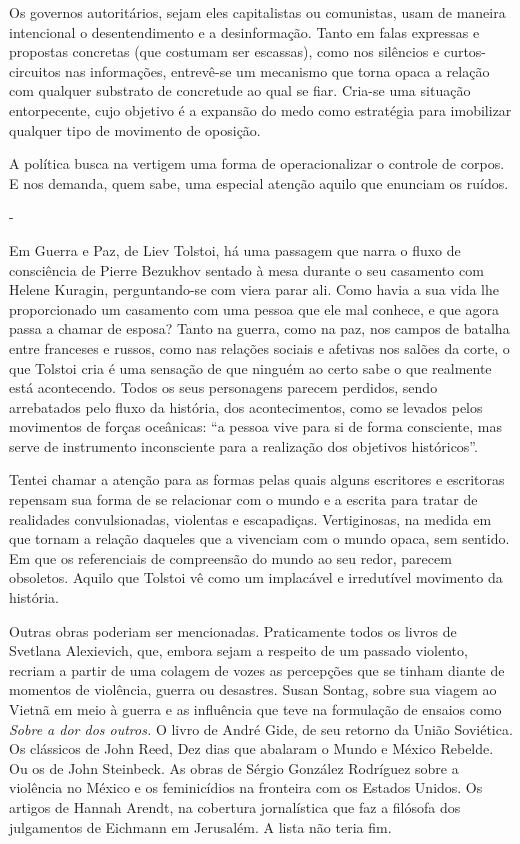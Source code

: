 Os governos autoritários, sejam eles capitalistas ou comunistas, usam de
maneira intencional o desentendimento e a desinformação. Tanto em falas
expressas e propostas concretas (que costumam ser escassas), como nos
silêncios e curtos-circuitos nas informações, entrevê-se um mecanismo
que torna opaca a relação com qualquer substrato de concretude ao qual
se fiar. Cria-se uma situação entorpecente, cujo objetivo é a expansão
do medo como estratégia para imobilizar qualquer tipo de movimento de
oposição.

A política busca na vertigem uma forma de operacionalizar o controle de
corpos. E nos demanda, quem sabe, uma especial atenção aquilo que
enunciam os ruídos.

-

Em Guerra e Paz, de Liev Tolstoi, há uma passagem que narra o fluxo de
consciência de Pierre Bezukhov sentado à mesa durante o seu casamento
com Helene Kuragin, perguntando-se com viera parar ali. Como havia a sua
vida lhe proporcionado um casamento com uma pessoa que ele mal conhece,
e que agora passa a chamar de esposa? Tanto na guerra, como na paz, nos
campos de batalha entre franceses e russos, como nas relações sociais e
afetivas nos salões da corte, o que Tolstoi cria é uma sensação de que
ninguém ao certo sabe o que realmente está acontecendo. Todos os seus
personagens parecem perdidos, sendo arrebatados pelo fluxo da história,
dos acontecimentos, como se levados pelos movimentos de forças
oceânicas: ``a pessoa vive para si de forma consciente, mas serve de
instrumento inconsciente para a realização dos objetivos históricos''.

Tentei chamar a atenção para as formas pelas quais alguns escritores e
escritoras repensam sua forma de se relacionar com o mundo e a escrita
para tratar de realidades convulsionadas, violentas e escapadiças.
Vertiginosas, na medida em que tornam a relação daqueles que a vivenciam
com o mundo opaca, sem sentido. Em que os referenciais de compreensão do
mundo ao seu redor, parecem obsoletos. Aquilo que Tolstoi vê como um
implacável e irredutível movimento da história.

Outras obras poderiam ser mencionadas. Praticamente todos os livros de
Svetlana Alexievich, que, embora sejam a respeito de um passado
violento, recriam a partir de uma colagem de vozes as percepções que se
tinham diante de momentos de violência, guerra ou desastres. Susan
Sontag, sobre sua viagem ao Vietnã em meio à guerra e as influência que
teve na formulação de ensaios como \emph{Sobre a dor dos outros.} O
livro de André Gide, de seu retorno da União Soviética. Os clássicos de
John Reed, Dez dias que abalaram o Mundo e México Rebelde. Ou os de John
Steinbeck. As obras de Sérgio González Rodríguez sobre a violência no
México e os feminicídios na fronteira com os Estados Unidos. Os artigos
de Hannah Arendt, na cobertura jornalística que faz a filósofa dos
julgamentos de Eichmann em Jerusalém. A lista não teria fim.

